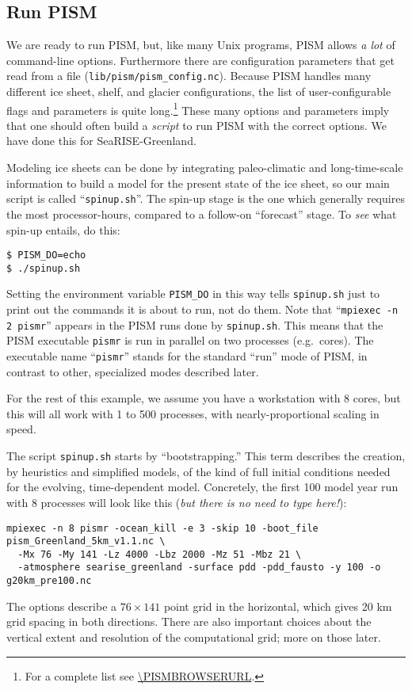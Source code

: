 \subsection{Run PISM}   \label{subsect:runscript}  We are ready to run PISM, but, like many Unix programs, PISM allows \emph{a lot} of command-line options.  Furthermore there are configuration parameters that get read from a file (\mbox{\texttt{lib/pism/pism_config.nc}}).  Because PISM handles many different ice sheet, shelf, and glacier configurations, the list of user-configurable flags and parameters is quite long.\footnote{For a complete list see \url{\PISMBROWSERURL}.}  These many options and parameters imply that one should often build a \emph{script} to run PISM with the correct options.  We have done this for \mbox{SeaRISE-Greenland}.

Modeling ice sheets can be done by integrating paleo-climatic and long-time-scale information to build a model for the present state of the ice sheet, so our main script is called ``\texttt{spinup.sh}''.  The spin-up stage is the one which generally requires the most processor-hours, compared to a follow-on ``forecast'' stage.  To \emph{see} what spin-up entails, do this:
\begin{verbatim}
$ PISM_DO=echo
$ ./spinup.sh
\end{verbatim}
Setting the environment variable \texttt{PISM_DO} in this way tells \texttt{spinup.sh} just to print out the commands it is about to run, not do them.  Note that ``\texttt{mpiexec -n 2 pismr}'' appears in the PISM runs done by \texttt{spinup.sh}.  This means that the PISM executable \texttt{pismr} is run in parallel on two processes (e.g.~cores).  The executable name ``\texttt{pismr}'' stands for the standard ``run'' mode of PISM, in contrast to other, specialized modes described later.

For the rest of this example, we assume you have a workstation with 8 cores, but this will all work with 1 to 500 processes, with nearly-proportional scaling in speed.

The script \texttt{spinup.sh} starts by ``bootstrapping.''  This term describes the creation, by heuristics and simplified models, of the kind of full initial conditions needed for the evolving, time-dependent model.  Concretely, the first 100 model year run with 8 processes will look like this (\emph{but there is no need to type here!}):
\small
\begin{verbatim}
mpiexec -n 8 pismr -ocean_kill -e 3 -skip 10 -boot_file pism_Greenland_5km_v1.1.nc \
  -Mx 76 -My 141 -Lz 4000 -Lbz 2000 -Mz 51 -Mbz 21 \
  -atmosphere searise_greenland -surface pdd -pdd_fausto -y 100 -o g20km_pre100.nc
\end{verbatim}
\normalsize
The options describe a $76\times 141$ point grid in the horizontal, which gives 20 km grid spacing in both directions.  There are also important choices about the vertical extent and resolution of the computational grid; more on those later. 

